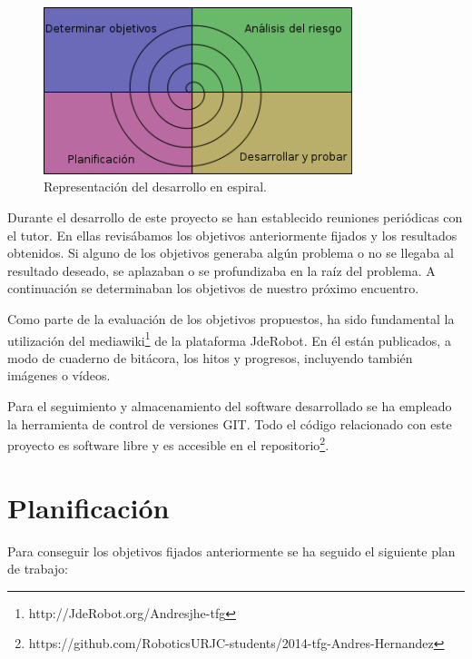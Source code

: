 \begin{figure}[h]
	\centering
	\includegraphics[width=90mm]{imag/desarrollo_en_espiral.png}
	\caption{Representación del desarrollo en espiral.}
	\label{fig:21_planificacion_espiral}
\end{figure}

Durante el desarrollo de este proyecto se han establecido reuniones periódicas con el tutor. En ellas revisábamos los objetivos anteriormente fijados y los resultados obtenidos. Si alguno de los objetivos generaba algún problema o no se llegaba al resultado deseado, se aplazaban o se profundizaba en la raíz del problema. A continuación se determinaban los objetivos de nuestro próximo encuentro. 

Como parte de la evaluación de los objetivos propuestos, ha sido fundamental la utilización del mediawiki\footnote{http://JdeRobot.org/Andresjhe-tfg}  de la plataforma JdeRobot. En él están publicados, a modo de cuaderno de bitácora, los hitos y progresos, incluyendo también imágenes o vídeos. 

Para el seguimiento y almacenamiento del software desarrollado se ha empleado la herramienta de control de versiones GIT. Todo el código relacionado con este proyecto es software libre y es accesible en el repositorio\footnote{https://github.com/RoboticsURJC-students/2014-tfg-Andres-Hernandez}.

\section{Planificación}

Para conseguir los objetivos fijados anteriormente se ha seguido el siguiente plan de trabajo:

